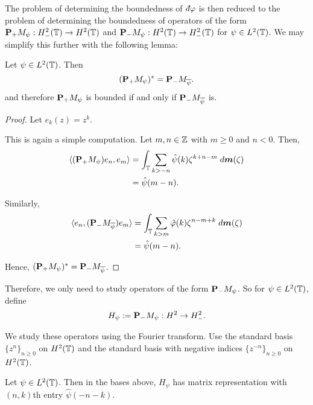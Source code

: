 The problem of determining the boundedness of $\qd\varphi$ is then reduced to the problem of determining
the boundedness of operators of the form $\mathbf{P}_+M_\psi:H^2_-(\mathbb{T})\rightarrow H^2(\mathbb{T})$ and $\mathbf{P}_-M_\psi:H^2(\mathbb{T})\rightarrow H^2_-(\mathbb{T})$ for $\psi \in L^2(\mathbb{T})$. We may simplify
this further with the following lemma:
\begin{lemma}
    Let $\psi \in L^2(\mathbb{T})$. Then
    \begin{equation*}
        (\mathbf{P}_+M_\psi)^* = \mathbf{P}_-M_{\overline{\psi}}.
    \end{equation*}
    and therefore $\mathbf{P}_+M_\psi$ is bounded if and only if $\mathbf{P}_-M_{\overline{\psi}}$ is.
\end{lemma}
\begin{proof}
    Let $e_k(z) = z^k$. 

    This is again a simple computation. Let $m,n\in \mathbb{Z}$ with $m \geq 0$ and $n < 0$. Then,
    \begin{align*}
        \langle (\mathbf{P}_+M_\psi)e_n,e_m\rangle &= \int_{\mathbb{T}}\sum_{k>-n} \hat{\psi}(k)\zeta^{k+n-m}\;d\boldsymbol{m}(\zeta)\\
        &= \hat{\psi}(m-n).
    \end{align*}
    
    Similarly,
    \begin{align*}
        \langle e_n, (\mathbf{P}_-M_{\overline{\psi}})e_m \rangle &= \int_{\mathbb{T}} \sum_{k > m} \hat{\varphi}(k) \zeta^{n-m+k}\;d\boldsymbol{m}(\zeta)\\
                                                &= \hat{\psi}(m-n).
    \end{align*}
    
    Hence, $(\mathbf{P}_+M_\psi)^* = \mathbf{P}_-M_{\overline{\psi}}$.

\end{proof}

Therefore, we only need to study operators of the form $\mathbf{P}_-M_\psi$. So for $\psi \in L^2(\mathbb{T})$, define
\begin{equation*}
    H_\psi := \mathbf{P}_-M_\psi:H^2\rightarrow H^2_-.
\end{equation*}

We study these operators using the Fourier transform. Use the standard basis $\{z^n\}_{n\geq 0}$
on $H^2(\mathbb{T})$ and the standard basis with negative indices $\{z^{-n}\}_{n \geq 0}$ on $H^2(\mathbb{T})$.

Let $\psi \in L^2(\mathbb{T})$. Then in the bases above, $H_\psi$ has matrix representation
with $(n,k)$th entry $\hat{\psi}(-n-k)$. 

